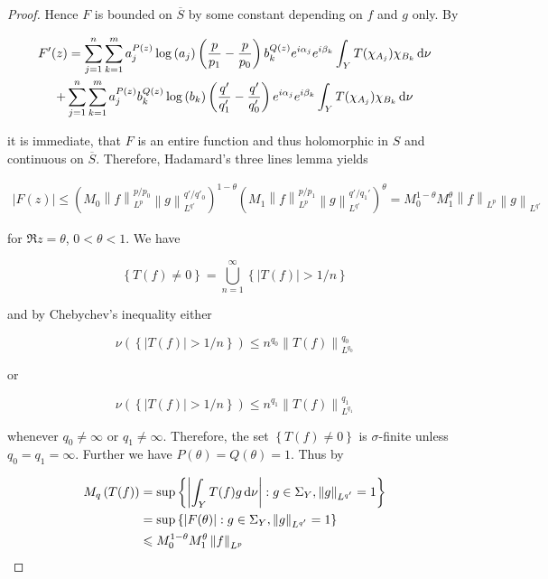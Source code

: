 \begin{proof}
Hence $F$ is bounded on $\overline{S}$ by some constant depending on $f$ and $g$ only. By 

\begin{multline*}
	F'(z) = \sum_{j = 1}^n\sum_{k = 1}^m a^{P(z)}_j\log \left( a_j \right) \left( \frac{p}{p_1} - \frac{p}{p_0} \right) b_k^{Q(z)}e^{i\alpha_j} e^{i\beta_k} \int_YT(\chi_{A_j})\chi_{B_k}\mathop{}\!\mathrm{d}\nu \\
	+  \sum_{j = 1}^n\sum_{k = 1}^m a^{P(z)}_jb_k^{Q(z)}\log\left( b_k \right)\left( \frac{q'}{q'_1} - \frac{q'}{q'_0} \right)e^{i\alpha_j} e^{i\beta_k} \int_YT(\chi_{A_j})\chi_{B_k}\mathop{}\!\mathrm{d}\nu 
\end{multline*}

	it is immediate, that $F$ is an entire function and thus holomorphic in $S$ and continuous on $\overline{S}$. Therefore, Hadamard's three lines lemma yields

\begin{gather*}
	\left| F(z) \right| \leqslant \left( M_0  \left\|f\right\|_{L^p}^{p/p_0} \left\|g\right\|_{L^{q'}}^{q'/q'_0} \right)^{1 - \theta}\left(  M_1 \left\|f\right\|_{L^p}^{p/p_1}\left\|g\right\|_{L^{q'}}^{q'/q_1'} \right)^\theta = M_0^{1 - \theta}M_1^\theta \left\|f\right\|_{L^p}\left\|g\right\|_{L^{q'}}
\end{gather*}

for $\Re z = \theta$, $0 < \theta < 1$. We have

\begin{equation*}
	\left\{ T(f) \neq 0\right\} = \bigcup_{n = 1}^\infty \left\{ \left| T(f)\right| > 1/n\right\}
\end{equation*}

and by Chebychev's inequality either

\begin{equation*}
	\nu\left( \left\{ \left| T(f)\right| > 1/n\right\} \right) \leqslant n^{q_0}\left\| T(f)\right\|_{L^{q_0}}^{q_0}
\end{equation*}

or

\begin{equation*}
	\nu\left( \left\{ \left| T(f)\right| > 1/n\right\} \right) \leqslant n^{q_1}\left\| T(f)\right\|_{L^{q_1}}^{q_1}
\end{equation*}

whenever $q_0 \neq \infty$ or $q_1 \neq \infty$. Therefore, the set $\left\{ T(f) \neq 0\right\}$ is $\sigma$-finite unless $q_0 = q_1 = \infty$. Further we have $P(\theta) = Q(\theta) = 1$. Thus by

\begin{gather*}
	\begin{aligned}
		M_q\left( T(f) \right) &= \sup\left\{\left| \int_Y T(f)g\mathop{}\!\mathrm{d}\nu\right| : g \in \Sigma_Y, \left\|g\right\|_{L^{q'}} = 1\right\}\\
		&=  \sup\left\{\left| F(\theta)\right| : g \in \Sigma_Y, \left\|g\right\|_{L^{q'}} = 1\right\}\\
		&\leqslant M_0^{1 - \theta}M_1^\theta \left\|f\right\|_{L^p}\\
	\end{aligned}
\end{gather*}


\end{proof}
